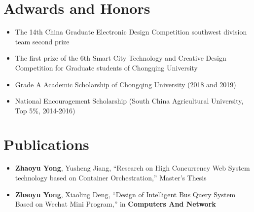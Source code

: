 \documentclass{CV}
\begin{document}
\section{Adwards and Honors}
\begin{itemize}
    \item The 14th China Graduate Electronic Design Competition southwest division team second prize
    \item The first prize of the 6th Smart City Technology and Creative Design Competition for Graduate students of Chongqing University
    \item Grade A Academic Scholarship of Chongqing University (2018 and 2019)
    \item National Encouragement Scholarship (South China Agricultural University, Top 5\%, 2014-2016)
\end{itemize}

\section{Publications}
\begin{itemize}
    \item \textbf{Zhaoyu Yong}, Yusheng Jiang, ``Research on High Concurrency Web System technology based on Container Orchestration,'' Master's Thesis
    \item \textbf{Zhaoyu Yong}, Xiaoling Deng,  ``Design of Intelligent Bus Query System Based on Wechat Mini Program,'' in \textbf{Computers And Network}
\end{itemize}
\end{document}
